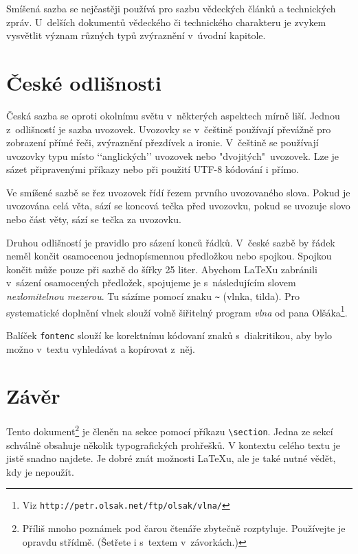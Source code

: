 \documentclass[10pt, a4paper,twocolumn]{article}
\def \lfnote {Příliš mnoho poznámek pod čarou čtenáře zbytečně rozptyluje. Používejte je opravdu střídmě. (Šetřete i s~textem v~závorkách.)}
\begin{document}
Smíšená sazba se nejčastěji používá pro sazbu vědeckých článků a technických zpráv. U~delších dokumentů vědeckého či technického charakteru je zvykem vysvětlit význam různých typů zvýraznění v~úvodní kapitole.

\section{České odlišnosti}

Česká sazba se oproti okolnímu světu v~některých aspektech mírně liší. Jednou z~odlišností je sazba uvozovek. Uvozovky se v~češtině používají převážně pro zobrazení přímé řeči, zvýraznění přezdívek a ironie. V~češtině se používají uvozovky typu  místo ‘‘anglických’’ uvozovek nebo "dvojitých"\ uvozovek. Lze je sázet připravenými příkazy nebo při použití UTF-8 kódování i přímo.\par
Ve smíšené sazbě se řez uvozovek řídí řezem prvního uvozovaného slova. Pokud je uvozována celá věta, sází se koncová tečka před uvozovku, pokud se uvozuje slovo nebo část věty, sází se tečka za uvozovku.\par
Druhou odlišností je pravidlo pro sázení konců řád\-ků. V~české sazbě by řádek neměl končit osamocenou jednopísmennou předložkou nebo spojkou. Spojkou  končit může pouze při sazbě do šířky 25 liter. Abychom LaTeXu zabránili v~sázení osamocených předložek, spojujeme je s~následujícím slovem \emph{nezlomitelnou mezerou}. Tu sázíme pomocí znaku \verb|~| (vlnka, tilda). Pro systematické doplnění vlnek slouží volně šiřitelný program \emph{vlna} od pana Olšáka\footnote{Viz \texttt{http://petr.olsak.net/ftp/olsak/vlna/}}.

Balíček \verb|fontenc| slouží ke korektnímu kódovaní zna\-ků s~diakritikou, aby bylo možno v~textu vyhledávat a kopírovat z~něj.  

\section{Závěr}

Tento dokument\footnote{\lfnote} je členěn na sekce pomocí příkazu \verb|\section|. 
Jedna ze sekcí schválně obsahuje několik typografických prohřešků. V kontextu celého textu je jistě snadno najdete. Je dobré znát možnosti \LaTeX u, ale je také nutné vědět, kdy je nepoužít.
\end{document}
